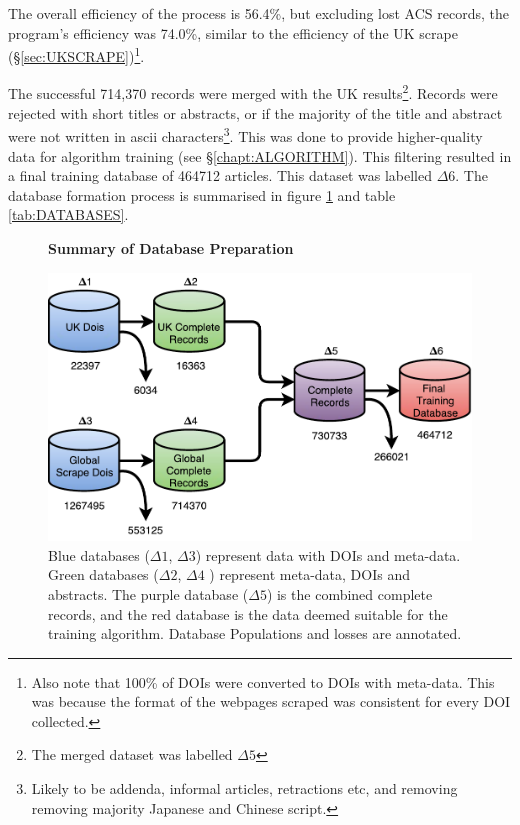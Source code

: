 The overall efficiency of the process is 56.4\%, but excluding lost ACS records, the program's efficiency was 74.0\%, similar to the efficiency of the UK scrape (\S\ref{sec:UKSCRAPE})\footnote{Also note that 100\% of DOIs were converted to DOIs with meta-data. This was because the format of the webpages scraped was consistent for every DOI collected.}.

The successful 714,370 records were merged with the UK results\footnote{The merged dataset was labelled $\Delta5$}. Records were rejected with short titles or abstracts, or if the majority of the title and abstract were not written in ascii characters\footnote{Likely to be addenda, informal articles, retractions etc, and removing removing majority Japanese and Chinese script.}. This was done to provide higher-quality data for algorithm training (see \S\ref{chapt:ALGORITHM}). This filtering resulted in a final training database of 464712 articles. This dataset was labelled $\Delta6$. The database formation process is summarised in figure \ref{fig:DATABASES} and table \ref{tab:DATABASES}.
\begin{figure}[H]
    \centering
    \textbf{Summary of Database Preparation}\par\medskip
    \includegraphics[scale=0.6]{Data_Acquisition/Databases2.pdf}
    \caption[Summary of Database Preparation]{Blue databases ($\Delta1$, $\Delta3$) represent data with DOIs and meta-data. Green databases ($\Delta2$, $\Delta4$ ) represent meta-data, DOIs and abstracts. The purple database ($\Delta5$) is the combined complete records, and the red database is the data deemed suitable for the training algorithm. Database Populations and losses are annotated.}
     \label{fig:DATABASES}
\end{figure}
